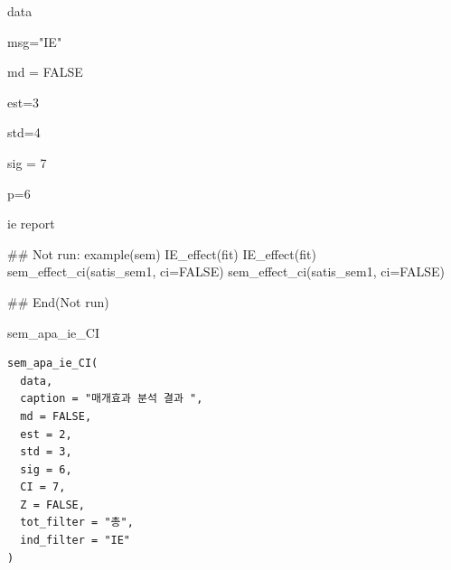 \documentclass[a4paper]{book}
\begin{document}
%
\begin{Arguments}
\begin{ldescription}
\item[\code{data}] data

\item[\code{msg}] msg="IE"

\item[\code{md}] md = FALSE

\item[\code{est}] est=3

\item[\code{std}] std=4

\item[\code{sig}] sig = 7

\item[\code{p}] p=6
\end{ldescription}
\end{Arguments}
%
\begin{Value}
ie report
\end{Value}
%
\begin{Examples}
\begin{ExampleCode}

\#\# Not run: 
example(sem)
IE_effect(fit)
IE_effect(fit) %
sem_effect_ci(satis_sem1, ci=FALSE)
sem_effect_ci(satis_sem1, ci=FALSE)%



## End(Not run)
\end{ExampleCode}
\end{Examples}
%
\begin{Description}
sem\_apa\_ie\_CI
\end{Description}
%
\begin{Usage}
\begin{verbatim}
sem_apa_ie_CI(
  data,
  caption = "매개효과 분석 결과 ",
  md = FALSE,
  est = 2,
  std = 3,
  sig = 6,
  CI = 7,
  Z = FALSE,
  tot_filter = "총",
  ind_filter = "IE"
)
\end{verbatim}
\end{Usage}
%
\end{document}
